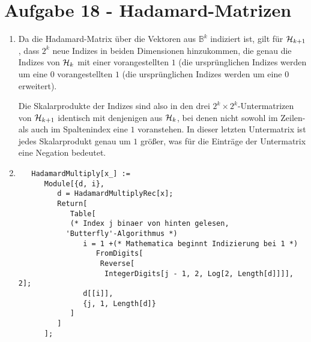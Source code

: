 \section*{Aufgabe 18 - Hadamard-Matrizen}
\begin{enumerate}
\item
	Da die Hadamard-Matrix über die Vektoren aus $\mathds{B}^k$ indiziert
	ist, gilt für $\mathcal{H}_{k+1}$, dass $2^k$ neue Indizes in beiden
	Dimensionen hinzukommen, die genau die Indizes von $\mathcal{H}_{k}$ mit
	einer vorangestellten $1$ (die ursprünglichen Indizes werden um eine
	$0$ vorangestellten $1$ (die ursprünglichen Indizes werden um eine $0$
	erweitert).
	
	Die Skalarprodukte der Indizes sind also in den drei $2^{k} \times
	2^{k}$-Untermatrizen von $\mathcal{H}_{k+1}$ identisch mit denjenigen
	aus $\mathcal{H}_{k}$, bei denen nicht sowohl im Zeilen- als auch im
	Spaltenindex eine $1$ voranstehen. In dieser letzten Untermatrix ist
	jedes Skalarprodukt genau um $1$ größer, was für die Einträge der
	Untermatrix eine Negation bedeutet.
\item
	\lstset{ %
		language=Mathematica,
		basicstyle=\small,
		numbers=left,
		numberstyle=\small,
		numbersep=-9pt
	}
	\begin{lstlisting}
   HadamardMultiply[x_] :=
      Module[{d, i},
         d = HadamardMultiplyRec[x];
         Return[
            Table[
            (* Index j binaer von hinten gelesen, 
	       'Butterfly'-Algorithmus *)
               i = 1 +(* Mathematica beginnt Indizierung bei 1 *)
                  FromDigits[
                   Reverse[
                    IntegerDigits[j - 1, 2, Log[2, Length[d]]]], 2];
               d[[i]],
               {j, 1, Length[d]}
            ]
         ]
      ];


\end{lstlisting}
\end{enumerate}
